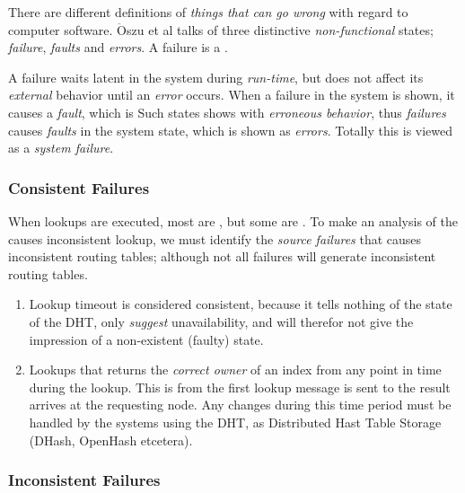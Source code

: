 There are different definitions of \emph{things that can go wrong} with regard to
 computer software. $\mathrm{\ddot{O}}$szu et al\cite{oszu-99-podds} talks of three distinctive
 \emph{non-functional} states; \emph{failure}, \emph{faults} and \emph{errors}.
 A failure is a .

A failure waits latent in the system during \emph{run-time},
 but does not affect its \emph{external} behavior until an \emph{error} occurs.
 When a failure in the system is shown, it causes a \emph{fault}, which is
  Such states
 shows with \emph{erroneous behavior}, thus \emph{failures} causes \emph{faults}
 in the system state,
 which is shown as \emph{errors}. Totally this is viewed as a \emph{system failure}.

\subsubsection{Consistent Failures}
\label{analysis:ConsistentFailure}

When lookups are executed, most are , but some are
 . To make an 
 analysis of the causes inconsistent lookup, we must identify the \emph{source failures} that causes
 inconsistent routing tables; although not all failures will generate inconsistent
 routing tables.

\begin{enumerate}
\item Lookup timeout is considered consistent, because it tells nothing of the state of
   the DHT, only \emph{suggest} unavailability, and will therefor not give the impression of a non-existent (faulty) state.
\item Lookups that returns the \emph{correct owner} of an index from any point in time during the
   lookup. This is from the first lookup message is sent to the result arrives at the
   requesting node. Any changes during this time period must be handled by the systems
   using the DHT, as Distributed Hast Table Storage (DHash\cite{chord-homepage},
   OpenHash\cite{bamboo-homepage} etcetera).
\end{enumerate}

\subsubsection{Inconsistent Failures}
\label{analysis:InconsistentFailure}

